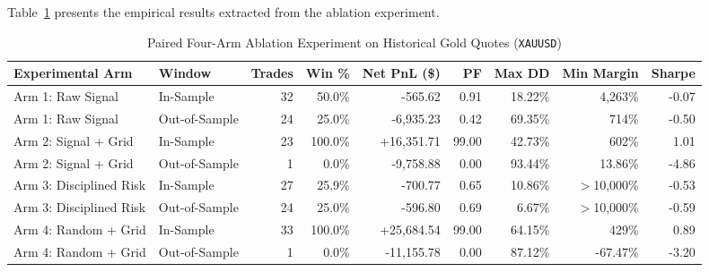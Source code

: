 \documentclass[11pt,a4paper]{article}
\begin{document}
Table~\ref{tab:ablation} presents the empirical results extracted from the ablation experiment.

\begin{table}[H]
\centering
\footnotesize
\setlength{\tabcolsep}{1.5pt}
\caption{Paired Four-Arm Ablation Experiment on Historical Gold Quotes (\texttt{XAUUSD})}
\label{tab:ablation}
\begin{tabular*}{\textwidth}{@{\extracolsep{\fill}}llrrrrrrr@{}}
\toprule
\textbf{Experimental Arm} & \textbf{Window} & \textbf{Trades} & \textbf{Win \%} & \textbf{Net PnL (\$)} & \textbf{PF} & \textbf{Max DD} & \textbf{Min Margin} & \textbf{Sharpe} \\
\midrule
Arm 1: Raw Signal & In-Sample & 32 & 50.0\% & -565.62 & 0.91 & 18.22\% & 4,263\% & -0.07 \\
Arm 1: Raw Signal & Out-of-Sample & 24 & 25.0\% & -6,935.23 & 0.42 & 69.35\% & 714\% & -0.50 \\
\midrule
Arm 2: Signal + Grid & In-Sample & 23 & 100.0\% & +16,351.71 & 99.00 & 42.73\% & 602\% & 1.01 \\
Arm 2: Signal + Grid & Out-of-Sample & 1 & 0.0\% & -9,758.88 & 0.00 & 93.44\% & 13.86\% & -4.86 \\
\midrule
Arm 3: Disciplined Risk & In-Sample & 27 & 25.9\% & -700.77 & 0.65 & 10.86\% & $>$10,000\% & -0.53 \\
Arm 3: Disciplined Risk & Out-of-Sample & 24 & 25.0\% & -596.80 & 0.69 & 6.67\% & $>$10,000\% & -0.59 \\
\midrule
Arm 4: Random + Grid & In-Sample & 33 & 100.0\% & +25,684.54 & 99.00 & 64.15\% & 429\% & 0.89 \\
Arm 4: Random + Grid & Out-of-Sample & 1 & 0.0\% & -11,155.78 & 0.00 & 87.12\% & -67.47\% & -3.20 \\
\bottomrule
\end{tabular*}
\end{table}
\end{document}

